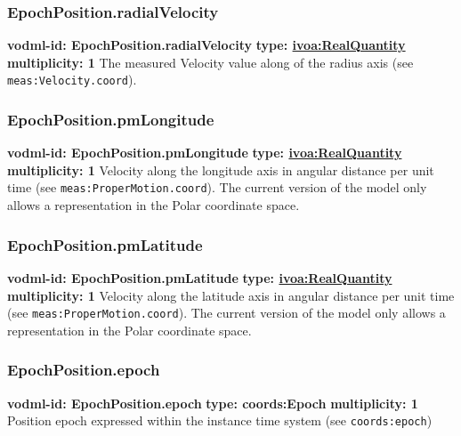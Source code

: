     \subsubsection{EpochPosition.radialVelocity}
      \textbf{vodml-id: EpochPosition.radialVelocity} \newline
      \textbf{type: \hyperref[sect:ivoa]{ivoa:RealQuantity}} \newline
      \textbf{multiplicity: 1} \newline 
      The measured Velocity value along of the radius axis (see \texttt{meas:Velocity.coord}).

    \subsubsection{EpochPosition.pmLongitude}
      \textbf{vodml-id: EpochPosition.pmLongitude} \newline
      \textbf{type: \hyperref[sect:ivoa]{ivoa:RealQuantity}} \newline
      \textbf{multiplicity: 1} \newline 
      Velocity along the longitude axis in angular distance per unit time (see \texttt{meas:ProperMotion.coord}). The current version of the model only allows a representation in the Polar coordinate space.

    \subsubsection{EpochPosition.pmLatitude}
      \textbf{vodml-id: EpochPosition.pmLatitude} \newline
      \textbf{type: \hyperref[sect:ivoa]{ivoa:RealQuantity}} \newline
      \textbf{multiplicity: 1} \newline 
      Velocity along the latitude axis in angular distance per unit time (see \texttt{meas:ProperMotion.coord}). The current version of the model only allows a representation in the Polar coordinate space.

    \subsubsection{EpochPosition.epoch}
      \textbf{vodml-id: EpochPosition.epoch} \newline
      \textbf{type: coords:Epoch} \newline
      \textbf{multiplicity: 1} \newline 
      Position epoch expressed within the instance time system (see \texttt{coords:epoch})

